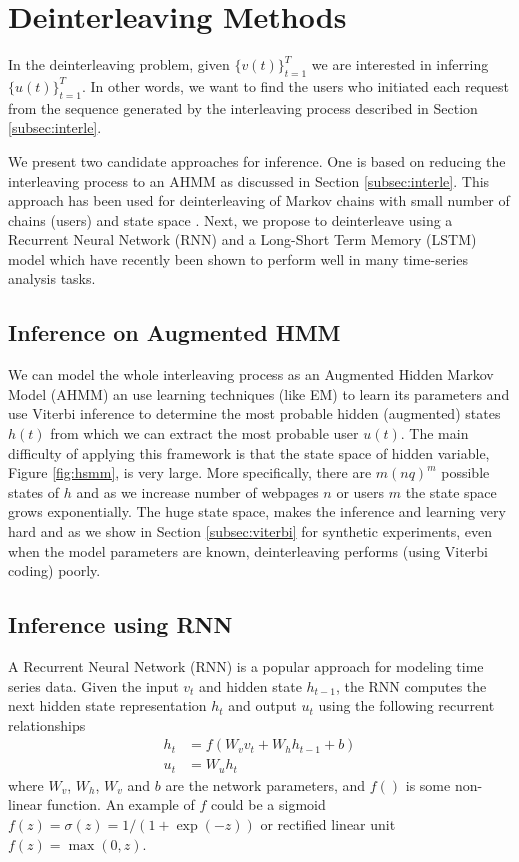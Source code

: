 \section{Deinterleaving Methods}
	In the deinterleaving problem, given $\{v(t)\}_{t=1}^T$ we are
        interested in inferring $\{u(t)\}_{t=1}^T$.  In other words,
        we want to find the users who initiated each request from the
        sequence generated by the interleaving process described in
        Section \ref{subsec:interle}.
	
	We present two candidate approaches for inference.  One is
        based on reducing the interleaving process to an AHMM as
        discussed in Section \ref{subsec:interle}.  This approach has
        been used for deinterleaving of Markov chains with small
        number of chains (users) and state space
        \cite{minot2014separation}.  Next, we propose to deinterleave
        using a Recurrent Neural Network (RNN) and a Long-Short Term
        Memory (LSTM) model which have recently been shown to 
        perform well in many time-series analysis tasks\cite{chung2014empirical,Hochreiter}.
	
	\subsection{Inference on Augmented HMM}
        We can model the whole interleaving process as an Augmented
        Hidden Markov Model (AHMM) an use learning techniques (like
        EM) to learn its parameters and use Viterbi inference to
        determine the most probable hidden (augmented) states $h(t)$
        from which we can extract the most probable user $u(t)$.  The
        main difficulty of applying this framework is that the state
        space of hidden variable, Figure \ref{fig:hsmm}, is very
        large.  More specifically, there are $m (nq)^m$ possible
        states of $h$ and as we increase number of webpages $n$ or
        users $m$ the state space grows exponentially.  The huge state
        space, makes the inference and learning very hard and as we
        show in Section \ref{subsec:viterbi} for synthetic
        experiments, even when the model parameters are known,
        deinterleaving performs (using Viterbi coding) poorly.
	
	\subsection{Inference using RNN}
        A Recurrent Neural Network (RNN) \cite{lecun2015deep}
        is a popular approach for modeling time series data. Given
        the input $v_t$ and hidden state $h_{t-1}$, the RNN computes 
        the next hidden state representation $h_t$ and output $u_t$ using
        the following recurrent relationships
	\begin{align}
	\label{eq:rnn}
	h_{t} &= f(W_v v_{t} + W_h h_{t - 1} + b)\\
	u_t &= W_u h_t
	\end{align}
	where $W_v$, $W_h$, $W_v$ and $b$ are the network parameters, and $f()$ is some non-linear function. 
        An example of $f$ could be a sigmoid $f(z) = \sigma(z) = 1/(1+\exp(-z))$ or rectified linear unit $f(z) = \max(0,z)$. 
	
